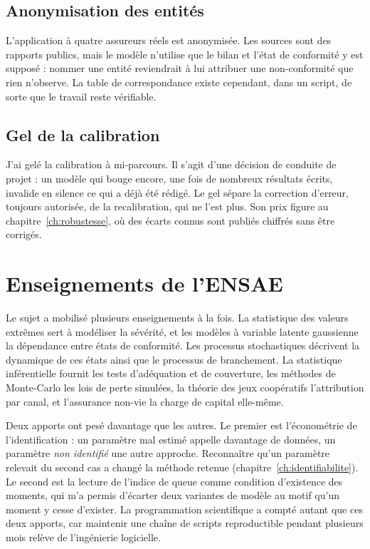 \subsection*{Anonymisation des entités}
L'application à quatre assureurs réels est anonymisée. Les sources sont des rapports publics, mais
le modèle n'utilise que le bilan et l'état de conformité y est supposé : nommer une entité
reviendrait à lui attribuer une non-conformité que rien n'observe. La table de correspondance existe
cependant, dans un script, de sorte que le travail reste vérifiable.

\subsection*{Gel de la calibration}
J'ai gelé la calibration à mi-parcours. Il s'agit d'une décision de conduite de projet : un modèle
qui bouge encore, une fois de nombreux résultats écrits, invalide en silence ce qui a déjà été
rédigé. Le gel sépare la correction d'erreur, toujours autorisée, de la recalibration, qui ne l'est
plus. Son prix figure au chapitre~\ref{ch:robustesse}, où des écarts connus sont publiés chiffrés
sans être corrigés.

\section*{Enseignements de l'ENSAE}
\label{ens:ensae}

Le sujet a mobilisé plusieurs enseignements à la fois. La statistique des valeurs extrêmes sert à
modéliser la sévérité, et les modèles à variable latente gaussienne la dépendance entre états de
conformité. Les processus stochastiques décrivent la dynamique de ces états ainsi que le processus
de branchement. La statistique inférentielle fournit les tests d'adéquation et de couverture, les
méthodes de Monte-Carlo les lois de perte simulées, la théorie des jeux coopératifs l'attribution
par canal, et l'assurance non-vie la charge de capital elle-même.

Deux apports ont pesé davantage que les autres. Le premier est l'économétrie de l'identification :
un paramètre mal estimé appelle davantage de données, un paramètre \emph{non identifié} une autre
approche. Reconnaître qu'un paramètre relevait du second cas a changé la méthode
retenue (chapitre~\ref{ch:identifiabilite}). Le second est la lecture de l'indice de queue comme
condition d'existence des moments, qui m'a permis d'écarter deux variantes de modèle au motif qu'un
moment y cesse d'exister. La programmation scientifique a compté autant que ces deux apports,
car maintenir une chaîne de scripts reproductible pendant plusieurs mois relève de l'ingénierie
logicielle.

